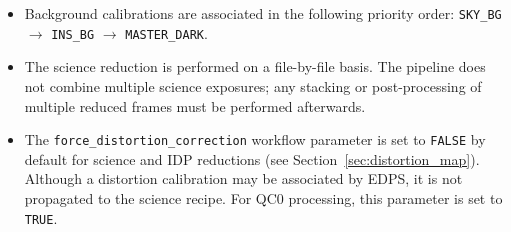 \begin{itemize}

\item Background calibrations are associated in the following priority order:
\texttt{SKY\_BG}
$\rightarrow$
\texttt{INS\_BG}
$\rightarrow$
\texttt{MASTER\_DARK}.

\item The science reduction is performed on a file-by-file basis. The pipeline does not combine multiple science exposures; any stacking or post-processing of multiple reduced frames must be performed afterwards.

\item The \texttt{force\_distortion\_correction} workflow parameter is set to
\texttt{FALSE} by default for science and IDP reductions (see Section~\ref{sec:distortion_map}). Although a distortion calibration may be associated by EDPS, it is not propagated to the science recipe. For QC0 processing, this parameter is set to \texttt{TRUE}.

\end{itemize}